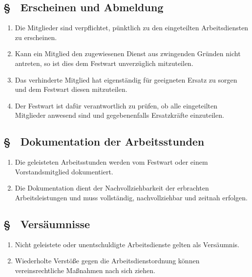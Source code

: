 \subsection{§ \theaoparagraphcounter\ Erscheinen und Abmeldung} \label{ao:par:erscheinen_abmeldung}
\begin{enumerate}
    \item \label{ao:abs:qqgxlh} Die Mitglieder sind verpflichtet, pünktlich zu den eingeteilten Arbeitsdiensten zu erscheinen.

    \item \label{ao:abs:i9edle} Kann ein Mitglied den zugewiesenen Dienst aus zwingenden Gründen nicht antreten, so ist dies dem Festwart unverzüglich mitzuteilen.

    \item \label{ao:abs:2n64dd} Das verhinderte Mitglied hat eigenständig für geeigneten Ersatz zu sorgen und dem Festwart diesen mitzuteilen.

    \item \label{ao:abs:de6os0} Der Festwart ist dafür verantwortlich zu prüfen, ob alle eingeteilten Mitglieder anwesend sind und gegebenenfalls Ersatzkräfte einzuteilen.
\end{enumerate}

\subsection{§ \theaoparagraphcounter\ Dokumentation der Arbeitsstunden} \label{ao:par:dokumentation_arbeitsstunden}
\begin{enumerate}
    \item \label{ao:abs:vsdcjn} Die geleisteten Arbeitsstunden werden vom Festwart oder einem Vorstandsmitglied dokumentiert.

    \item \label{ao:abs:8k201e} Die Dokumentation dient der Nachvollziehbarkeit der erbrachten Arbeitsleistungen und muss vollständig, nachvollziehbar und zeitnah erfolgen.
\end{enumerate}

\subsection{§ \theaoparagraphcounter\ Versäumnisse} \label{ao:par:versaeumnisse}
\begin{enumerate}
    \item \label{ao:abs:qhuai8} Nicht geleistete oder unentschuldigte Arbeitsdienste gelten als Versäumnis.

    \item \label{ao:abs:q8ouur} Wiederholte Verstöße gegen die Arbeitsdienstordnung können vereinsrechtliche Maßnahmen nach sich ziehen.
\end{enumerate}


